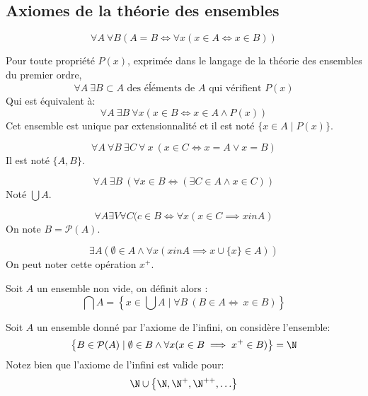 \subsection{Axiomes de la théorie des ensembles}

\begin{axiom} [Extensionnalité]
	$$\forall A \ \forall B ( A = B \iff \forall x (x \in A \iff x \in B))$$
\end{axiom}

\begin{axiom} [Compréhension]
	Pour toute propriété $P(x)$, exprimée dans le langage de la théorie des ensembles du premier ordre,
	$$ \forall A \ \exists B \subset A \text{ des éĺéments de } A \text{ qui vérifient } P(x)$$
	Qui est équivalent à:
	$$ \forall A \  \exists B \  \forall x (x \in B \iff x \in A \land P(x))$$
	Cet ensemble est unique par extensionnalité et il est noté $\{x \in A \mid P(x)\}$.
\end{axiom}

\begin{axiom}
	$$ \forall A \  \forall B \  \exists C \  \forall \ x \  (x \in C \iff x = A \lor x = B)$$
	Il est noté $\{A,B\}$.
\end{axiom}

\begin{axiom}[Réunion]
	$$ \forall A \ \exists B \ (\forall x \in B \iff (\exists C \in A  \land x \in  C))$$
	Noté $\bigcup A$.
\end{axiom}


\begin{axiom}
	$$ \forall A \exists V \forall C ( c \in B \iff \forall x ( x \in C \implies x    in A ) $$
	On note $B = \mathcal{P}(A)$.
\end{axiom}


\begin{axiom}[Infini]
	$$ \exists A (\emptyset \in A \land \forall x (x in A \implies x \cup \{x\} \in A))$$
	On peut noter cette opération $x^+$.
\end{axiom}


\begin{remarque}
	Soit $A$ un ensemble non vide, on définit alors :
	$$ \bigcap A = \left\{x \in \bigcup A \mid \forall B \ (B \in A \iff \ x \in B)\right\}$$
\end{remarque}


Soit $A$ un ensemble donné par l'axiome de l'infini, on considère l'ensemble:
$$ \left\{ B \in \mathcal{P}(A) \mid \emptyset \in B \land \forall x (x \in B \implies x^+ \in B) \right\} = \N $$
Notez bien que l'axiome de l'infini est valide pour:
$$ \N \cup \left\{ \N, \N^+, \N^{++}, \ldots \right\} $$


